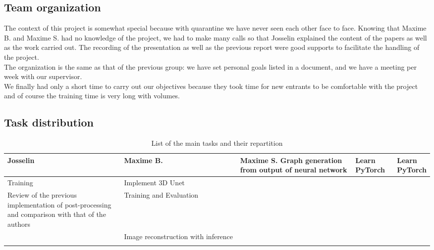 \subsection{Team organization}
The context of this project is somewhat special because with quarantine we have never seen each other face to face. Knowing that Maxime B. and Maxime S. had no knowledge of the project, we had to make many calls so that Josselin explained the content of the papers as well as the work carried out.
The recording of the presentation as well as the previous report were good supports to facilitate the handling of the project.\\

The organization is the same as that of the previous group: we have set personal goals listed in a document, and we have a meeting per week with our supervisor.\\

We finally had only a short time to carry out our objectives because they took time for new entrants to be comfortable with the project and of course the training time is very long with volumes.

\subsection{Task distribution}

\begin{longtable}{ |p{0.30\linewidth}|p{0.30\linewidth}|p{0.30\linewidth}|p{0.30\linewidth}|p{0.30\linewidth}| } 
	\hline
	Josselin & Maxime B. & Maxime S.\endhead
	\hline
	Graph generation from output of neural network
    & Learn PyTorch & Learn PyTorch\\ 
	\hline
	Training & Implement 3D Unet &\\ 
	\hline
	Review of the previous implementation of post-processing and comparison with that of the authors & Training and Evaluation & \\ 
	\hline
	& Image reconstruction with inference & \\
	\hline
	\caption{List of the main tasks and their repartition}
	\label{tab:tasks}
\end{longtable}